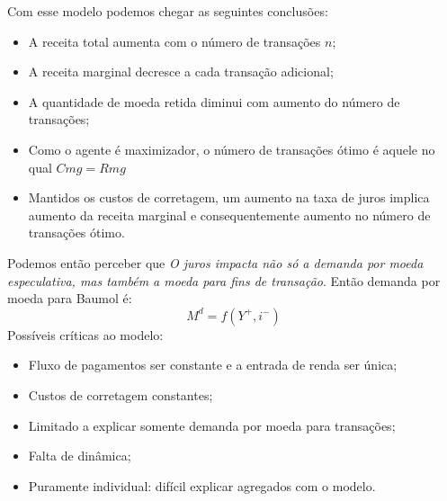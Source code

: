 \documentclass[12pt,a4paper,oneside,brazil]{abntex2}
\begin{document}
Com esse modelo podemos chegar as seguintes conclusões:
\begin{itemize}
\item A receita total aumenta com o número de transações $n$;
\item A receita marginal decresce a cada transação adicional;
\item A quantidade de moeda retida diminui com aumento do número de transações;
\item Como o agente é maximizador, o número de transações ótimo é aquele no qual $Cmg = Rmg$
\item Mantidos os custos de corretagem, um aumento na taxa de juros implica aumento da receita marginal e consequentemente aumento no número de transações ótimo.
\end{itemize}
Podemos então perceber que \emph{O juros impacta não só a demanda por moeda especulativa, mas também a moeda para fins de transação}. Então demanda por moeda para Baumol é:
\[ M^d = f(Y^+ , i^-) \]
Possíveis críticas ao modelo:
\begin{itemize}
\item Fluxo de pagamentos ser constante e a entrada de renda ser única;
\item Custos de corretagem constantes;
\item Limitado a explicar somente demanda por moeda para transações;
\item Falta de dinâmica;
\item Puramente individual: difícil explicar agregados com o modelo.
\end{itemize}
\end{document}
